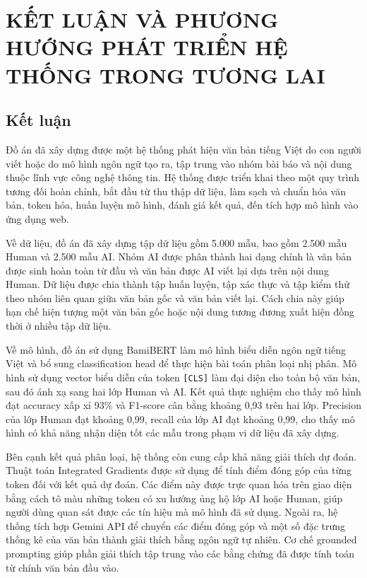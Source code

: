 \chapter{KẾT LUẬN VÀ PHƯƠNG HƯỚNG PHÁT TRIỂN HỆ THỐNG TRONG TƯƠNG LAI}

\section{Kết luận}

Đồ án đã xây dựng được một hệ thống phát hiện văn bản tiếng Việt do con người viết hoặc do mô hình ngôn ngữ tạo ra, tập trung vào nhóm bài báo và nội dung thuộc lĩnh vực công nghệ thông tin. Hệ thống được triển khai theo một quy trình tương đối hoàn chỉnh, bắt đầu từ thu thập dữ liệu, làm sạch và chuẩn hóa văn bản, token hóa, huấn luyện mô hình, đánh giá kết quả, đến tích hợp mô hình vào ứng dụng web.

Về dữ liệu, đồ án đã xây dựng tập dữ liệu gồm 5.000 mẫu, bao gồm 2.500 mẫu Human và 2.500 mẫu AI. Nhóm AI được phân thành hai dạng chính là văn bản được sinh hoàn toàn từ đầu và văn bản được AI viết lại dựa trên nội dung Human. Dữ liệu được chia thành tập huấn luyện, tập xác thực và tập kiểm thử theo nhóm liên quan giữa văn bản gốc và văn bản viết lại. Cách chia này giúp hạn chế hiện tượng một văn bản gốc hoặc nội dung tương đương xuất hiện đồng thời ở nhiều tập dữ liệu.

Về mô hình, đồ án sử dụng BamiBERT làm mô hình biểu diễn ngôn ngữ tiếng Việt và bổ sung classification head để thực hiện bài toán phân loại nhị phân. Mô hình sử dụng vector biểu diễn của token \texttt{[CLS]} làm đại diện cho toàn bộ văn bản, sau đó ánh xạ sang hai lớp Human và AI. Kết quả thực nghiệm cho thấy mô hình đạt accuracy xấp xỉ 93\% và F1-score cân bằng khoảng 0,93 trên hai lớp. Precision của lớp Human đạt khoảng 0,99, recall của lớp AI đạt khoảng 0,99, cho thấy mô hình có khả năng nhận diện tốt các mẫu trong phạm vi dữ liệu đã xây dựng.

Bên cạnh kết quả phân loại, hệ thống còn cung cấp khả năng giải thích dự đoán. Thuật toán Integrated Gradients được sử dụng để tính điểm đóng góp của từng token đối với kết quả dự đoán. Các điểm này được trực quan hóa trên giao diện bằng cách tô màu những token có xu hướng ủng hộ lớp AI hoặc Human, giúp người dùng quan sát được các tín hiệu mà mô hình đã sử dụng. Ngoài ra, hệ thống tích hợp Gemini API để chuyển các điểm đóng góp và một số đặc trưng thống kê của văn bản thành giải thích bằng ngôn ngữ tự nhiên. Cơ chế grounded prompting giúp phần giải thích tập trung vào các bằng chứng đã được tính toán từ chính văn bản đầu vào.

